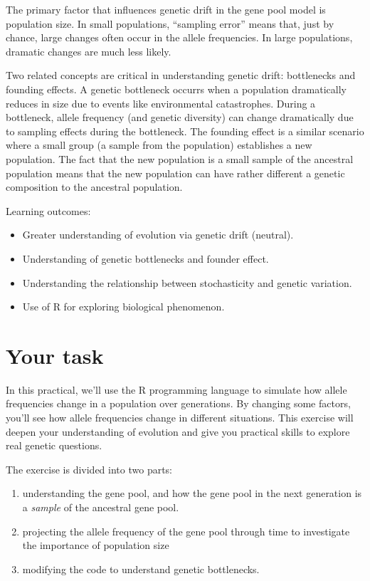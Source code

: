\documentclass[
  a4paper]{book}
\providecommand{\tightlist}{%
  \setlength{\itemsep}{0pt}\setlength{\parskip}{0pt}}
\begin{document}
The primary factor that influences genetic drift in the gene pool model is population size. In small populations, ``sampling error'' means that, just by chance, large changes often occur in the allele frequencies. In large populations, dramatic changes are much less likely.

Two related concepts are critical in understanding genetic drift: bottlenecks and founding effects. A genetic bottleneck occurrs when a population dramatically reduces in size due to events like environmental catastrophes. During a bottleneck, allele frequency (and genetic diversity) can change dramatically due to sampling effects during the bottleneck. The founding effect is a similar scenario where a small group (a sample from the population) establishes a new population. The fact that the new population is a small sample of the ancestral population means that the new population can have rather different a genetic composition to the ancestral population.

\begin{do-something}
Learning outcomes:

\begin{itemize}
\tightlist
\item
  Greater understanding of evolution via genetic drift (neutral).
\item
  Understanding of genetic bottlenecks and founder effect.
\item
  Understanding the relationship between stochasticity and genetic
  variation.
\item
  Use of R for exploring biological phenomenon.
\end{itemize}
\end{do-something}

\section{Your task}\label{your-task-12}

In this practical, we'll use the R programming language to simulate how allele frequencies change in a population over generations. By changing some factors, you'll see how allele frequencies change in different situations. This exercise will deepen your understanding of evolution and give you practical skills to explore real genetic questions.

The exercise is divided into two parts:

\begin{enumerate}
\def\labelenumi{(\arabic{enumi})}
\tightlist
\item
  understanding the gene pool, and how the gene pool in the next generation is a \emph{sample} of the ancestral gene pool.
\item
  projecting the allele frequency of the gene pool through time to investigate the importance of population size
\item
  modifying the code to understand genetic bottlenecks.
\end{enumerate}
\end{document}
